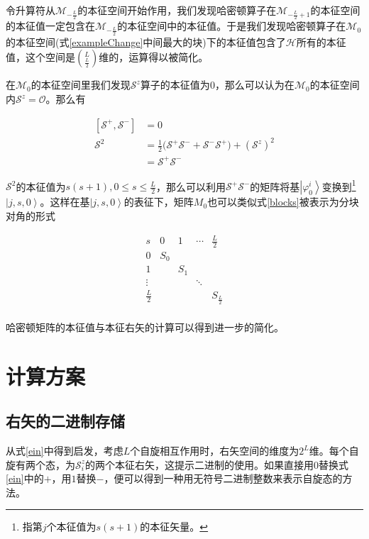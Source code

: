 \documentclass[UTF8,12pt]{article}
\providecommand\Ket[1]{\left|\right. #1 \left.\right\rangle}
\numberwithin{equation}{subsection}
\begin{document}
	令升算符从$\mathcal M_{-\frac{L}{2}}$的本征空间开始作用，我们发现哈密顿算子在$\mathcal M_{-\frac{L}{2}+1}$的本征空间的本征值一定包含在$\mathcal M_{-\frac{L}{2}}$的本征空间中的本征值。于是我们发现哈密顿算子在$\mathcal M_0$的本征空间(式\ref{exampleChange}中间最大的块)下的本征值包含了$\mathcal H$所有的本征值，这个空间是$\binom{L}{\frac{L}{2}}$维的，运算得以被简化。
	
	在$\mathcal M_0$的本征空间里我们发现$\mathcal S^z$算子的本征值为$0$，那么可以认为在$\mathcal M_0$的本征空间内$\mathcal S^z = \mathcal O$。那么有
	\begin{snugshade}
		\begin{equation}
			\begin{aligned}
				\left[\mathcal S^+,\mathcal S^-\right]&=0\\
				\mathcal S^2 &= \frac{1}{2}\Big(\mathcal S^+\mathcal S^-+\mathcal S^-\mathcal S^+\Big)+(\mathcal S^z)^2\\
				&=\mathcal S^+\mathcal S^-
			\end{aligned}
			\label{M0Ssqaure}
		\end{equation}
	\end{snugshade}
	
	$\mathcal S^2$的本征值为$s(s+1),0\leq s \leq \frac{L}{2}$，那么可以利用$\mathcal S^+\mathcal S^-$的矩阵将基$\Ket{\varphi^i_0}$变换到\footnote{指第$j$个本征值为$s(s+1)$的本征矢量。}$\Ket{j,s,0}$。这样在基$\Ket{j,s,0}$的表征下，矩阵$M_0$也可以类似式\ref{blocks}被表示为分块对角的形式
	\begin{snugshade}
		\begin{equation}
			\begin{array}{c|c|c|c|c}
				s&0&1&\cdots&\frac{L}{2}\\
				\hline
				0&S_{0}&&&\\
				\hline
				1&&S_{1}&&\\
				\hline
				\vdots&&&\ddots&\\
				\hline
				\frac{L}{2}&&&&S_{\frac{L}{2}}\\
			\end{array}
			\label{blocksM0}
		\end{equation}
	\end{snugshade}

	哈密顿矩阵的本征值与本征右矢的计算可以得到进一步的简化。
	\clearpage
	\section{计算方案}
	\subsection{右矢的二进制存储}
	从式\ref{ein}中得到启发，考虑$L$个自旋相互作用时，右矢空间的维度为$2^L$维。每个自旋有两个态，为$\mathcal S^z_i$的两个本征右矢，这提示二进制的使用。如果直接用$0$替换式\ref{ein}中的$+$，用$1$替换$-$，便可以得到一种用无符号二进制整数来表示自旋态的方法。
	
\end{document}
